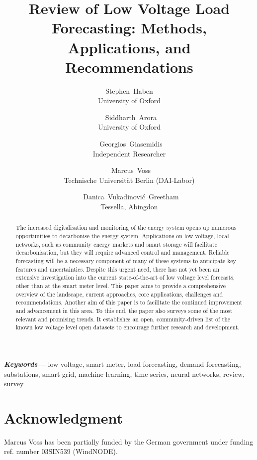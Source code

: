 \documentclass[a4paper]{article}
\title{Review of Low Voltage Load Forecasting: Methods, Applications, and Recommendations}
\author{Stephen~Haben\\
University of Oxford\\
\and ~Siddharth~Arora\\
University of Oxford\\
\and ~Georgios~Giasemidis\\
Independent Researcher\\
\and ~Marcus~Voss\\
Technische Universit\"at Berlin (DAI-Labor)\\
\and ~Danica~Vukadinovi\'c~Greetham\\
Tessella, Abingdon\\
}
\date{}
\providecommand{\keywords}[1]
{
	\small	
	\textbf{\textit{Keywords---}} #1
}
\begin{document}
\maketitle

\begin{abstract}
	The increased digitalisation and monitoring of the energy system opens up numerous opportunities to decarbonise the energy system. Applications on low voltage, local networks, such as community energy markets and smart storage will facilitate decarbonisation, but they will require advanced control and management. Reliable forecasting will be a necessary component of many of these systems to anticipate key features and uncertainties. Despite this urgent need, there has not yet been an extensive investigation into the current state-of-the-art of low voltage level forecasts, other than at the smart meter level. This paper aims to provide a comprehensive overview of the landscape, current approaches, core applications, challenges and recommendations. Another aim of this paper is to facilitate the continued improvement and advancement in this area. To this end, the paper also surveys some of the most relevant and promising trends. It establishes an open, community-driven list of the known low voltage level open datasets to encourage further research and development. 
\end{abstract}

\keywords{low voltage, smart meter, load forecasting, demand forecasting, substations, smart grid, machine learning, time series, neural networks, review, survey}








\section*{Acknowledgment}
Marcus Voss has been partially funded by the German government under funding ref. number 03SIN539 (WindNODE).



\end{document}
